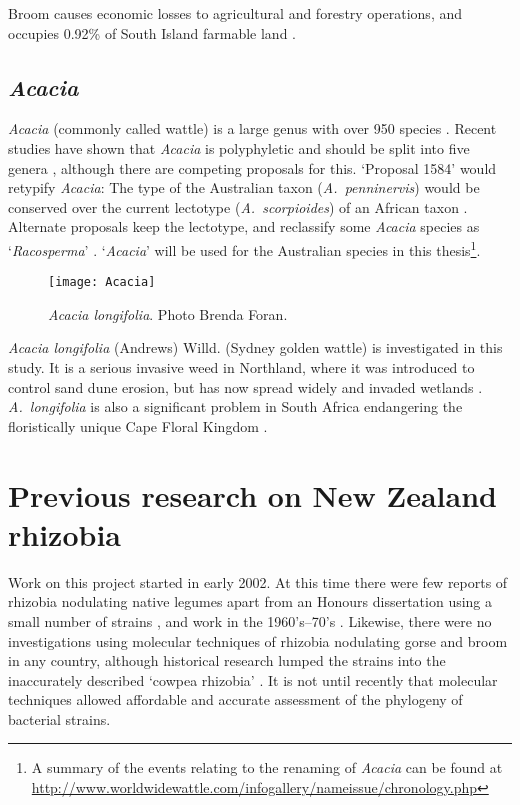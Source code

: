 Broom causes economic losses to agricultural and forestry
operations, and occupies 0.92\% of South Island farmable land
\citep{Fowler00}.


\subsection{\emph{Acacia}}

\emph{Acacia} (commonly called wattle) is a  large genus with over
950 species \citep{ILDIS}. Recent studies have shown that
\emph{Acacia} is polyphyletic and should be split into five genera
\citep{Luckow05}, although there are competing proposals for this.
`Proposal 1584' would retypify \emph{Acacia}: The type of the
Australian taxon (\emph{A.~penninervis}) would be conserved over the
current lectotype (\emph{A.~scorpioides}) of an African taxon
\citep{Orchard05}. Alternate proposals keep the lectotype, and
reclassify some \emph{Acacia} species as `\emph{Racosperma}'
\citep{Luckow05}. `\emph{Acacia}' will be used for the Australian
species in this thesis\footnote{A summary of the events relating to
the renaming of \emph{Acacia} can be found at
\url{http://www.worldwidewattle.com/infogallery/nameissue/chronology.php}}.

\begin{figure} [tb]
    \centering
    \texttt{[image: Acacia]}
    \caption[\emph{Acacia longifolia}]{\emph{Acacia longifolia}. Photo \cc Brenda Foran.}
    \label{p-Acacia}
\end{figure}

\emph{Acacia longifolia} (Andrews) Willd. (Sydney golden wattle) is
investigated in this study. It is a serious invasive weed in
Northland, where it was introduced to control sand dune erosion, but
has now spread widely and invaded wetlands \citep{Hicks01}.
\emph{A.~longifolia} is also a significant problem in South Africa
endangering the floristically unique Cape Floral Kingdom
\citep{Dennill99,VanWilgen04}.



\section{Previous research on New Zealand rhizobia}

Work on this project started in early 2002. At this time there were
few reports of rhizobia nodulating native legumes apart from an
Honours dissertation  using a small number of strains
\citep{McCallum96}, and work in the 1960's--70's
\citep{Greenwood69,Greenwood78a,Greenwood78b}. Likewise, there were
no investigations using molecular techniques of rhizobia nodulating
gorse and broom in any country, although historical research lumped
the strains into the inaccurately described `cowpea rhizobia'
\citep{Pieters27,Wilson39a}. It is not until recently that molecular
techniques allowed affordable and accurate assessment of the
phylogeny of bacterial strains.

